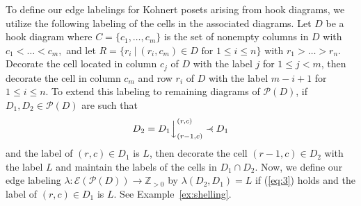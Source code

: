 \documentclass[letterpaper,10pt]{article}
\newcommand{\ldownarrow}{\Big\downarrow}
\newcommand{\precdot}{\prec\mathrel{\mkern-5mu}\mathrel{\cdot}}
\begin{document}
To define our edge labelings for Kohnert posets arising from hook diagrams, we utilize the following labeling of the cells in the associated diagrams. Let $D$ be a hook diagram where $C=\{c_1,\dots,c_m\}$ is the set of nonempty columns in $D$ with $c_1<\dots<c_m,$ and let $R=\{r_i~|~(r_i,c_m)\in D\text{ for }1\leq i\leq n\}$ with $r_1>\dots>r_n$. Decorate the cell located in column $c_j$ of $D$ with the label $j$ for $1\leq j<m$,  then decorate the cell in column $c_m$ and row $r_i$ of $D$ with the label $m-i+1$ for $1\leq i\leq n$. To extend this labeling to remaining diagrams of $\mathcal{P}(D)$, if $D_1,D_2\in\mathcal{P}(D)$ are such that 
\begin{equation}\label{eq:3}
    D_2=D_1\ldownarrow^{(r,c)}_{(r-1,c)}\precdot D_1
\end{equation}
and the label of $(r,c)\in D_1$ is $L$, then decorate the cell $(r-1,c)\in D_2$ with the label $L$ and maintain the labels of the cells in $D_1\cap D_2$. Now, we define our edge labeling $\lambda:\mathcal{E}(\mathcal{P}(D))\to\mathbb{Z}_{>0}$ by $\lambda(D_2,D_1)=L$ if (\ref{eq:3}) holds and the label of $(r,c)\in D_1$ is $L$. See Example~\ref{ex:shelling}.
\end{document}
